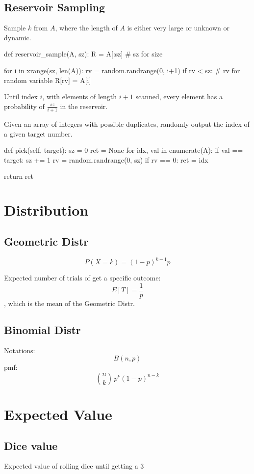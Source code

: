 \subsection{Reservoir Sampling}
Sample $k$ from $A$, where the length of $A$ is either very large or unknown or dynamic. 
\begin{python}
def reservoir_sample(A, sz):
  R = A[:sz]  # sz for size
  
  for i in xrange(sz, len(A)):
    rv = random.randrange(0, i+1)
    if rv < sz: # rv for random variable
      R[rv] = A[i]
\end{python}

Until index $i$, with elements of length $i+1$ scanned, every element has a probability of $\frac{sz}{i+1}$ in the reservoir. 

 Given an array of integers with possible duplicates, randomly output the index of a given target number.
\begin{python}
def pick(self, target):
    sz = 0
    ret = None
    for idx, val in enumerate(A):
        if val == target:
            sz += 1
            rv = random.randrange(0, sz)
            if rv == 0:
                ret = idx

    return ret
\end{python}

\section{Distribution}
\subsection{Geometric Distr}
$$
P(X=k) = (1-p)^{k-1}p
$$

Expected number of trials of get a specific outcome:
$$
E[T] = \frac{1}{p}
$$
, which is the mean of the Geometric Distr. 
\subsection{Binomial Distr}
Notations:
$$
B(n, p)
$$
pmf:
$$
{n \choose k}\,p^{k}(1-p)^{n-k}
$$

\section{Expected Value}
\subsection{Dice value}
Expected value of rolling dice until getting a 3
